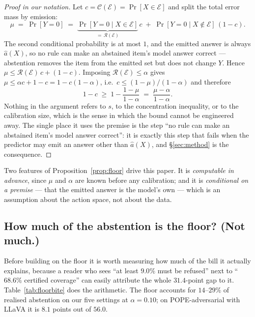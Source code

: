 \documentclass{article}
\theoremstyle{plain}
\theoremstyle{definition}
\theoremstyle{remark}
\newcommand{\Risk}{\mathcal{R}}
\newcommand{\Cov}{\mathcal{C}}
\newcommand{\emit}{\mathcal{E}}
\begin{document}
\begin{proof}[Proof in our notation]
Let $c=\Cov(\emit)=\Pr[X\in\emit]$ and split the total error mass by emission:
\[
  \mu \;=\; \Pr[Y=0] \;=\; \underbrace{\Pr[Y=0\mid X\in\emit]}_{=\,\Risk(\emit)}\,c
        \;+\; \Pr[Y=0\mid X\notin\emit]\,(1-c).
\]
The second conditional probability is at most $1$, and the emitted answer is always
$\hat a(X)$, so no rule can make an abstained item's model answer correct --- abstention
removes the item from the emitted set but does not change $Y$. Hence
$\mu\le\Risk(\emit)\,c+(1-c)$. Imposing $\Risk(\emit)\le\alpha$ gives
$\mu\le\alpha c+1-c=1-c(1-\alpha)$, i.e.\ $c\le(1-\mu)/(1-\alpha)$ and therefore
\[
  1-c \;\ge\; 1-\frac{1-\mu}{1-\alpha} \;=\; \frac{\mu-\alpha}{1-\alpha}.
\]
Nothing in the argument refers to $s$, to the concentration inequality, or to the
calibration size, which is the sense in which the bound cannot be engineered away. The
single place it uses the premise is the step ``no rule can make an abstained item's model
answer correct'': it is exactly this step that fails when the predictor may emit an answer
other than $\hat a(X)$, and \S\ref{sec:method} is the consequence.
\end{proof}

Two features of Proposition~\ref{prop:floor} drive this paper. It is \emph{computable in
advance}, since $\mu$ and $\alpha$ are known before any calibration; and it is
\emph{conditional on a premise} --- that the emitted answer is the model's own --- which is
an assumption about the action space, not about the data.

\subsection{How much of the abstention is the floor? (Not much.)}
\label{sec:floorbite}

Before building on the floor it is worth measuring how much of the bill it actually explains,
because a reader who sees ``at least $9.0\%$ must be refused'' next to ``$68.6\%$ certified
coverage'' can easily attribute the whole $31.4$-point gap to it. Table~\ref{tab:floorbite}
does the arithmetic. The floor accounts for $14$--$29\%$ of realised abstention on our five
settings at $\alpha=0.10$; on POPE-adversarial with LLaVA it is $8.1$ points out of $56.0$.
\end{document}
